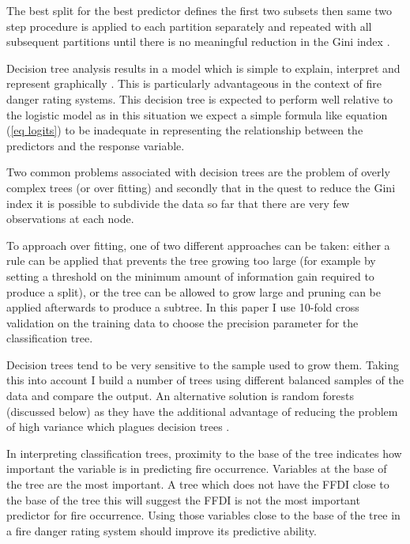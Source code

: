 \documentclass[11pt,a4paper]{article}
\begin{document}
The best split for the best predictor defines the first two subsets then same two step procedure is applied to each partition separately and repeated with all subsequent partitions until there is no meaningful reduction in the Gini index \citep{berk08,james13}.

Decision tree analysis results in a model which is simple to explain, interpret and represent graphically \citep{james13}. This is particularly advantageous in the context of fire danger rating systems.
This decision tree is expected to perform well relative to the logistic model as in this situation we expect a simple formula like equation (\ref{eq logits}) to be inadequate in representing the relationship between the predictors and the response variable.

Two common problems associated with decision trees are the problem of overly complex trees (or over fitting) and secondly that in the quest to reduce the Gini index it is possible to subdivide the data so far that there are very few observations at each node.

To approach over fitting, one of two different approaches can be taken: either a rule can be applied that prevents the tree growing too large (for example by setting a threshold on the minimum amount of information gain required to produce a split), or the tree can be allowed to grow large and pruning can be applied afterwards to produce a subtree. In this paper I use 10-fold cross validation on the training data to choose the precision parameter for the classification tree.

Decision trees tend to be very sensitive to the sample used to grow them. Taking this into account I build a number of trees using different balanced samples of the data and compare the output. An alternative solution is random forests (discussed below) as they have the additional advantage of reducing the problem of high variance which plagues decision trees \citep{james13}.

In interpreting classification trees, proximity to the base of the tree indicates how important the variable is in predicting fire occurrence. Variables at the base of the tree are the most important. A tree which does not have the FFDI close to the base of the tree this will suggest the FFDI is not the most important predictor for fire occurrence. Using those variables close to the base of the tree in a fire danger rating system should improve its predictive ability.
\end{document}
